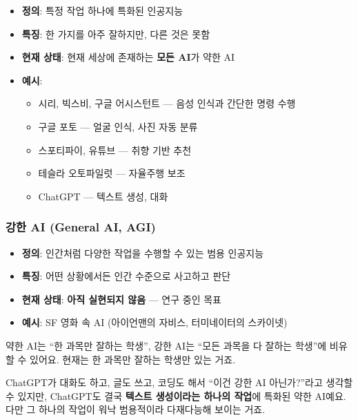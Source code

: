\documentclass[11pt,a4paper]{article}
\begin{document}
\begin{itemize}[leftmargin=2em]
\item \textbf{정의}: 특정 작업 하나에 특화된 인공지능
\item \textbf{특징}: 한 가지를 아주 잘하지만, 다른 것은 못함
\item \textbf{현재 상태}: 현재 세상에 존재하는 \textbf{모든 AI}가 약한 AI
\item \textbf{예시}:
  \begin{itemize}
  \item {} 시리, 빅스비, 구글 어시스턴트 — 음성 인식과 간단한 명령 수행
  \item {} 구글 포토 — 얼굴 인식, 사진 자동 분류
  \item {} 스포티파이, 유튜브 — 취향 기반 추천
  \item {} 테슬라 오토파일럿 — 자율주행 보조
  \item {} ChatGPT — 텍스트 생성, 대화
  \end{itemize}
\end{itemize}

\subsubsection{ 강한 AI (General AI, AGI)}

\begin{itemize}[leftmargin=2em]
\item \textbf{정의}: 인간처럼 다양한 작업을 수행할 수 있는 범용 인공지능
\item \textbf{특징}: 어떤 상황에서든 인간 수준으로 사고하고 판단
\item \textbf{현재 상태}: \textbf{아직 실현되지 않음} — 연구 중인 목표
\item \textbf{예시}: SF 영화 속 AI (아이언맨의 자비스, 터미네이터의 스카이넷)
\end{itemize}

\begin{tipbox}
약한 AI는 ``한 과목만 잘하는 학생'', 강한 AI는 ``모든 과목을 다 잘하는 학생''에 비유할 수 있어요. 현재는 한 과목만 잘하는 학생만 있는 거죠.
\end{tipbox}

ChatGPT가 대화도 하고, 글도 쓰고, 코딩도 해서 ``이건 강한 AI 아닌가?''라고 생각할 수 있지만, ChatGPT도 결국 \textbf{텍스트 생성이라는 하나의 작업}에 특화된 약한 AI예요. 다만 그 하나의 작업이 워낙 범용적이라 다재다능해 보이는 거죠.
\end{document}
